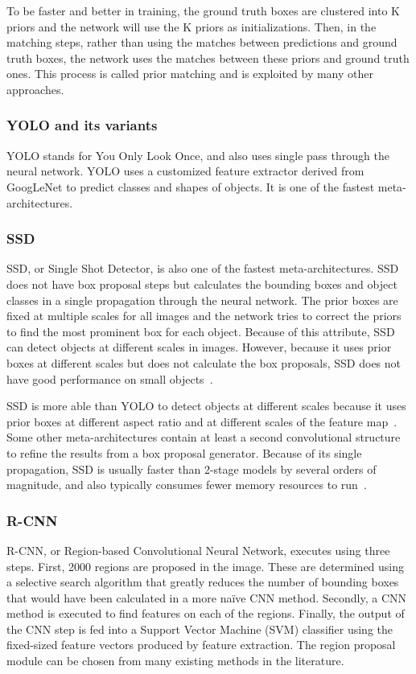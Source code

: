 \documentclass[conference]{IEEEtran}
\begin{document}
To be faster and better in training, the ground truth boxes are clustered into K priors and the network will use the K priors as initializations. Then, in the matching steps, rather than using the matches between predictions and ground truth boxes, the network uses the matches between these priors and ground truth ones. This process is called prior matching and is exploited by many other approaches.

\subsubsection{YOLO and its variants}
YOLO stands for You Only Look Once, and also uses single pass through the neural network.  YOLO uses a customized feature extractor derived from GoogLeNet to predict classes and shapes of objects.  It is one of the fastest meta-architectures.

\subsubsection{SSD}
SSD, or Single Shot Detector, is also one of the fastest meta-architectures.
SSD does not have box proposal steps but calculates the bounding boxes and object classes in a single propagation through the neural network.
The prior boxes are fixed at multiple scales for all images and the network tries to correct the priors to find the most prominent box for each object.
Because of this attribute, SSD can detect objects at different scales in images.
However, because it uses prior boxes at different scales but does not calculate the box proposals, SSD does not have good performance on small objects~\cite{liu2016ssd}.

SSD is more able than YOLO to detect objects at different scales because it uses prior boxes at different aspect ratio and at different scales of the feature map~\cite{liu2016ssd}. 
Some other meta-architectures contain at least a second convolutional structure to refine the results from a box proposal generator. 
Because of its single propagation, SSD is usually faster than 2-stage models by several orders of magnitude, and also typically consumes fewer memory resources to run~\cite{huang2017speed}.

\subsubsection{R-CNN}
R-CNN, or Region-based Convolutional Neural Network, executes using three steps.  First, 2000 regions are proposed in the image.  These are determined using a selective search algorithm that greatly reduces the number of bounding boxes that would have been calculated in a more na\"{i}ve CNN method.  Secondly, a CNN method is executed to find features on each of the regions.  Finally, the output of the CNN step is fed into a Support Vector Machine (SVM) classifier using the fixed-sized feature vectors produced by feature extraction.
The region proposal module can be chosen from many existing methods in the literature.   
\end{document}
